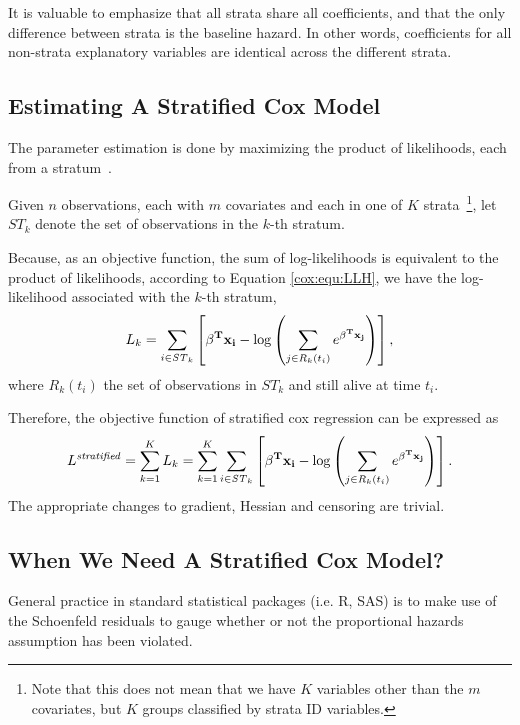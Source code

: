 It is valuable to emphasize that all strata share all coefficients, and that the
only difference between strata is the baseline hazard.  In other words,
coefficients for all non-strata explanatory variables are identical across the
different strata.

\subsection{Estimating A Stratified Cox Model}\label{cox:estimate-stratified}
The parameter estimation is done by maximizing the product of likelihoods, each
from a stratum~\cite{stratified-ethz-slides}.

Given $n$ observations, each with $m$ covariates and each in one of $K$
strata~\footnote{Note that this does not mean that we have $K$ variables other
than the $m$ covariates, but $K$ groups classified by strata ID variables.}, let
$\mathit{ST}_{k}$ denote the set of observations in the $k$-th stratum.

Because, as an objective function, the sum of log-likelihoods is equivalent to
the product of likelihoods, according to Equation \ref{cox:equ:LLH}, we have the
log-likelihood associated with the $k$-th stratum,
\begin{equation}\label{cox:equ:obj-each-stratum}L_{k} = \sum_{i \in \mathit{ST}_{k}} \left[  \bold{\beta^T x_i} - \log\left(\sum_{j \in R_k(t_i)} e^{\bold{\beta^T x_j} } \right) \right],
\end{equation}
where $R_k(t_i)$ the set of observations in $\mathit{ST}_{k}$ and still alive at time $t_i$.

Therefore, the objective function of stratified cox regression can be expressed as
\begin{equation}\label{cox:equ:stratified-obj}
L^{\mathit{stratified}} = \sum_{k=1}^{K} L_{k} = \sum_{k=1}^{K} \sum_{i \in \mathit{ST}_{k}} \left[  \bold{\beta^T x_i} - \log\left(\sum_{j \in R_k(t_i)} e^{\bold{\beta^T x_j} } \right) \right].
\end{equation}
The appropriate changes to gradient, Hessian and censoring are trivial.

\subsection{When We Need A Stratified Cox Model?}\label{cox:diagnostic}
General practice in standard statistical packages (i.e. R, SAS) is to
make use of the Schoenfeld residuals to gauge whether or not the
proportional hazards assumption has been violated.

